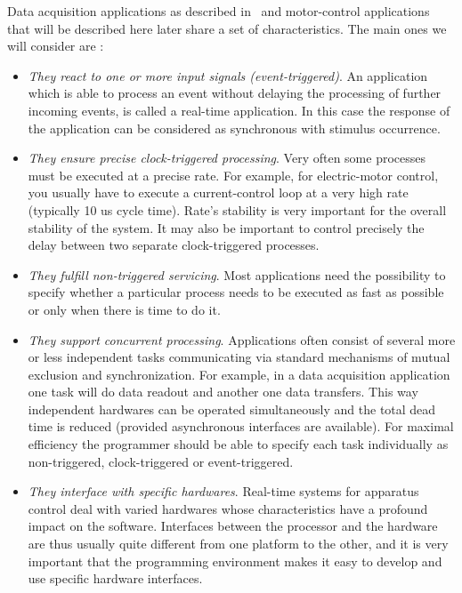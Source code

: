 \documentclass[10pt]{report}
\begin{document}
Data acquisition applications as described in~\cite{Delchini:95} and
motor-control applications that will be described here later
share a set of characteristics. The main ones we will consider
are :

\begin{itemize}

\item {\em They react to one or more input signals (event-triggered)}. An
  application which is able to process an event without delaying
  the processing of further incoming events, is called a
  real-time application. In this case the response of the
  application can be considered as synchronous with stimulus
  occurrence.

\item {\em They ensure precise clock-triggered processing}. Very often
  some processes must be executed at a precise rate. For example,
  for electric-motor control, you usually have to execute a
  current-control loop at a very high rate (typically 10 us cycle
  time). Rate's stability is very important for the overall
  stability of the system. It may also be important to control
  precisely the delay between two separate clock-triggered
  processes.

\item {\em They fulfill non-triggered servicing}. Most applications need
  the possibility to specify whether a particular process needs
  to be executed as fast as possible or only when
  there is time to do it.

\item {\em They support concurrent processing}. Applications often consist
  of several more or less independent tasks communicating via
  standard mechanisms of mutual exclusion and synchronization.
  For example, in a data acquisition application one task will do
  data readout and another one data transfers. This way
  independent hardwares can be operated simultaneously and the
  total dead time is reduced (provided asynchronous interfaces
  are available). For maximal efficiency the programmer should be
  able to specify each task individually as non-triggered,
  clock-triggered or event-triggered.

\item {\em They interface with specific hardwares}. Real-time systems for
  apparatus control deal with varied hardwares whose
  characteristics have a profound impact on the software.
  Interfaces between the processor and the hardware are thus
  usually quite different from one platform to the other, and it
  is very important that the programming environment makes it
  easy to develop and use specific hardware interfaces.

\end{itemize}
\end{document}
